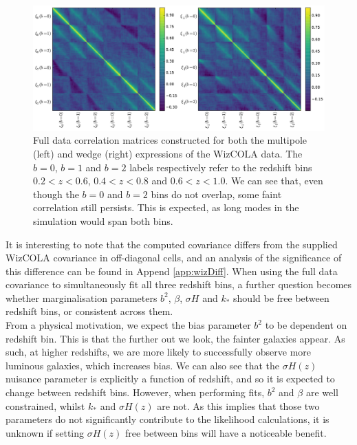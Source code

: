\documentclass[titlesmallcaps, examinerscopy, copyrightpage]{uqthesis}
\begin{document}
\begin{figure}[h!]
  \begin{center}
    \includegraphics[width=\textwidth]{images/fullCorrelations.pdf}
  \end{center}
  \caption{Full data correlation matrices constructed for both the multipole (left) and wedge (right) expressions of the WizCOLA data. The $b=0$, $b=1$ and $b=2$ labels respectively refer to the redshift bins $0.2 < z < 0.6$, $0.4 < z < 0.8$ and $0.6 < z < 1.0$. We can see that, even though the $b=0$ and $b=2$ bins do not overlap, some faint correlation still persists. This is expected, as long modes in the simulation would span both bins.}
  \label{fig:fullCorrelations}
\end{figure}



It is interesting to note that the computed covariance differs from the supplied WizCOLA covariance in off-diagonal cells, and an analysis of the significance of this difference can be found in Append \ref{app:wizDiff}. When using the full data covariance to simultaneously fit all three redshift bins, a further question becomes whether marginalisation parameters $b^2$, $\beta$, $\sigma H$ and $k_*$ should be free between redshift bins, or consistent across them. \\

From a physical motivation, we expect the bias parameter $b^2$ to be dependent on redshift bin. This is that the further out we look, the fainter galaxies appear. As such, at higher redshifts, we are more likely to successfully observe more luminous galaxies, which increases bias. We can also see that the $\sigma H(z)$ nuisance parameter is explicitly a function of redshift, and so it is expected to change between redshift bins. However, when performing fits, $b^2$ and $\beta$ are well constrained, whilst $k_*$ and $\sigma H(z)$ are not. As this implies that those two parameters do not significantly contribute to the likelihood calculations, it is unknown if setting $\sigma H(z)$ free between bins will have a noticeable benefit. 
\end{document}
